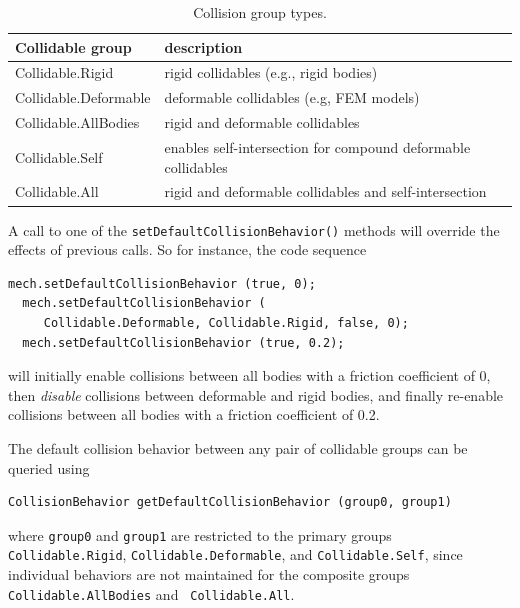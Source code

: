 \begin{table}[h]
\begin{center}
\begin{tabular}{|ll|}
\hline
Collidable group & description \\
\hline
Collidable.Rigid & rigid collidables (e.g., rigid bodies) \\
Collidable.Deformable & deformable collidables (e.g, FEM models) \\
Collidable.AllBodies & rigid and deformable collidables \\
Collidable.Self & enables self-intersection
for compound deformable collidables\\
Collidable.All & rigid and deformable collidables and self-intersection\\
\hline
\end{tabular}
\end{center}
\caption{Collision group types.}
\label{CollisionGroups:tab}
\end{table}

A call to one of the {\tt setDefaultCollisionBehavior()} methods will
override the effects of previous calls. So for instance, the code
sequence
%
\begin{lstlisting}[]
  mech.setDefaultCollisionBehavior (true, 0);
  mech.setDefaultCollisionBehavior (
     Collidable.Deformable, Collidable.Rigid, false, 0);
  mech.setDefaultCollisionBehavior (true, 0.2);
\end{lstlisting}
%
will initially enable collisions between all bodies with a friction
coefficient of 0, then {\it disable} collisions between deformable and
rigid bodies, and finally re-enable collisions between all bodies with
a friction coefficient of 0.2.

The default collision behavior between any pair of collidable groups can
be queried using
%
\begin{lstlisting}[]
  CollisionBehavior getDefaultCollisionBehavior (group0, group1)
\end{lstlisting}
%
where {\tt group0} and {\tt group1} are restricted to the
primary groups {\tt Collidable.Rigid}, {\tt Collidable.Deformable},
and {\tt Collidable.Self}, since individual behaviors are not
maintained for the composite groups {\tt Collidable.AllBodies} and {\tt
Collidable.All}.

